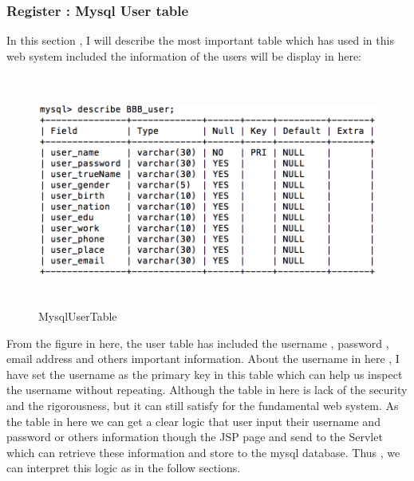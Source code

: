 \documentclass[12pt]{article}
\begin{document}
\subsubsection{Register : Mysql User table}
In this section , I will describe the most important table which has used in this web system included the information of the users will be display in here:
\begin{figure}[H]
	\centering
		\includegraphics[height=3in]{images/MysqlUserTable.jpg}
		\caption[MysqlUserTable]{MysqlUserTable}
	\label{fig:MysqlUserTable}
\end{figure}
	From the figure in here, the user table has included the username , password , email address and others important information. About the username  in here , I have set the username as the primary key in this table which can help us inspect the username without repeating.
	Although the table in here is lack of the security and the rigorousness, but it can still satisfy for the fundamental web system. As the table in here we can get a clear logic that user input their username and password or others information though the JSP page and send to the Servlet which can  retrieve these information  and store to the mysql database.  Thus , we can interpret this logic as  in the follow sections.
\cleardoublepage
\end{document}
